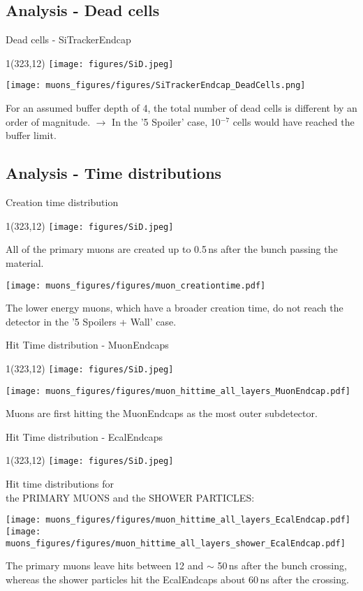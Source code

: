 \documentclass[xcolor={dvipsnames}]{beamer}
\newcommand{\sidlogo}{
  \setlength{\TPHorizModule}{1pt}
  \setlength{\TPVertModule}{1pt}
  \begin{textblock}{1}(323,12)
   \texttt{[image: figures/SiD.jpeg]}
  \end{textblock}
  }
\begin{document}
\subsection{Analysis - Dead cells}
\begin{frame}{Dead cells - \small SiTrackerEndcap}
\sidlogo
 \begin{center}
\texttt{[image: muons\_figures/figures/SiTrackerEndcap\_DeadCells.png]}
\end{center}
\small For an assumed buffer depth of 4, the total number of dead cells is different by an order of magnitude. $\rightarrow$ In the '5 Spoiler' case, 10$^{-7}$ cells would have reached the buffer limit.
\end{frame}

\subsection{Analysis - Time distributions}
\begin{frame}{Creation time distribution}
\sidlogo
All of the primary muons are created up to 0.5\,ns after the bunch passing the material.
 \begin{center}
\texttt{[image: muons\_figures/figures/muon\_creationtime.pdf]}
\end{center}
The lower energy muons, which have a broader creation time, do not reach the detector in the '5 Spoilers + Wall' case.
\end{frame}
\begin{frame}{Hit Time distribution - \small MuonEndcaps}
\sidlogo
 \begin{center}
\texttt{[image: muons\_figures/figures/muon\_hittime\_all\_layers\_MuonEndcap.pdf]}
\end{center}
Muons are first hitting the MuonEndcaps as the most outer subdetector.
\end{frame}
\begin{frame}{Hit Time distribution - \small EcalEndcaps}
\sidlogo
Hit time distributions for \\
\hspace*{0.6cm} the PRIMARY MUONS and the SHOWER PARTICLES:
 \begin{center}
\texttt{[image: muons\_figures/figures/muon\_hittime\_all\_layers\_EcalEndcap.pdf]}
\texttt{[image: muons\_figures/figures/muon\_hittime\_all\_layers\_shower\_EcalEndcap.pdf]}
\end{center}
The primary muons leave hits between 12 and $\sim$ 50\,ns after the bunch crossing, whereas the shower particles hit the EcalEndcaps about 60\,ns after the crossing.
\end{frame}
\end{document}
